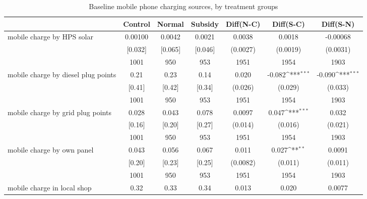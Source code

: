 \begin{table}[htbp]\centering
\def\sym#1{\ifmmode^{#1}\else\(^{#1}\)\fi}
\caption{Baseline mobile phone charging sources, by treatment groups \label{tab:"balance"}}
\begin{tabular*}{1\hsize}{@{\hskip\tabcolsep\extracolsep\fill}l*{1}{cccccc}}
\toprule
                                &  Control&   Normal&  Subsidy&Diff(N-C)         &Diff(S-C)         &Diff(S-N)         \\
\midrule
mobile charge by HPS solar      &  0.00100&   0.0042&   0.0021&   0.0038         &   0.0018         & -0.00068         \\
                                &  [0.032]&  [0.065]&  [0.046]& (0.0027)         & (0.0019)         & (0.0031)         \\
                                &     1001&      950&      953&     1951         &     1954         &     1903         \\
mobile charge by diesel plug points&     0.21&     0.23&     0.14&    0.020         &   -0.082\sym{***}&   -0.090\sym{***}\\
                                &   [0.41]&   [0.42]&   [0.34]&  (0.026)         &  (0.029)         &  (0.033)         \\
                                &     1001&      950&      953&     1951         &     1954         &     1903         \\
mobile charge by grid plug points&    0.028&    0.043&    0.078&   0.0097         &    0.047\sym{***}&    0.032         \\
                                &   [0.16]&   [0.20]&   [0.27]&  (0.014)         &  (0.016)         &  (0.021)         \\
                                &     1001&      950&      953&     1951         &     1954         &     1903         \\
mobile charge by own panel      &    0.043&    0.056&    0.067&    0.011         &    0.027\sym{**} &   0.0091         \\
                                &   [0.20]&   [0.23]&   [0.25]& (0.0082)         &  (0.011)         &  (0.011)         \\
                                &     1001&      950&      953&     1951         &     1954         &     1903         \\
mobile charge in local shop     &     0.32&     0.33&     0.34&    0.013         &    0.020         &   0.0077         \\

\end{tabular*}
\end{table}
